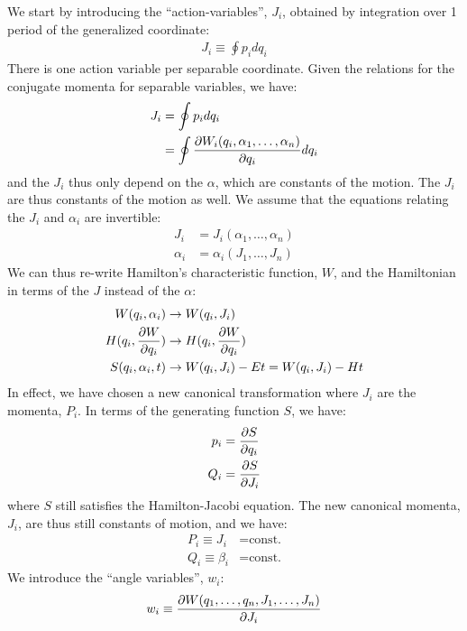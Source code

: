 
We start by introducing the ``action-variables'', $J_i$, obtained by integration over 1 period of the generalized coordinate:
\begin{align}
J_i\equiv \oint p_idq_i
\end{align}
There is one action variable per separable coordinate. Given the relations for the conjugate momenta for separable variables, we have:
\begin{align}
J_i&=\oint p_idq_i\nonumber\\
&=\oint \frac{\partial W_i(q_i, \alpha_1, \dots , \alpha_n)}{\partial q_i} dq_i \nonumber
\end{align}
and the $J_i$ thus only depend on the $\alpha$, which are constants of the motion. The $J_i$ are thus constants of the motion as well. We assume that the equations relating the $J_i$ and $\alpha_i$ are invertible:
\begin{align}
J_i&=J_i(\alpha_1, \dots , \alpha_n)\nonumber\\
\alpha_i&=\alpha_i(J_1, \dots, J_n)
\end{align} 
We can thus re-write Hamilton's characteristic function, $W$, and the Hamiltonian in terms of the $J$ instead of the $\alpha$:
\begin{align}
W(q_i,\alpha_i)&\to W(q_i, J_i)\nonumber\\
H(q_i,\frac{\partial W}{\partial q_i})&\to H(q_i,\frac{\partial W}{\partial q_i})\nonumber\\
S(q_i,\alpha_i,t)&\to W(q_i, J_i)-Et =W(q_i, J_i)-Ht
\end{align}
In effect, we have chosen a new canonical transformation where $J_i$ are the momenta, $P_i$. In terms of the generating function $S$, we have:
\begin{align}
p_i&=\frac{\partial S}{\partial q_i}\nonumber\\
Q_i&=\frac{\partial S}{\partial J_i}
\end{align}
where $S$ still satisfies the Hamilton-Jacobi equation. The new canonical momenta, $J_i$, are thus still constants of motion, and we have:
\begin{align}
P_i\equiv J_i&=\text{const.}\nonumber\\
Q_i\equiv \beta_i&=\text{const.}
\end{align}
We introduce the ``angle variables'', $w_i$:
\begin{align}
w_i\equiv\frac{\partial W(q_1,\dots , q_n,J_1, \dots , J_n)}{\partial J_i}
\end{align}
